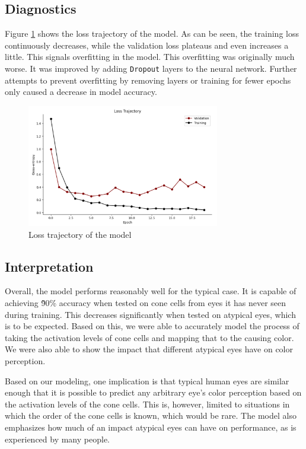 \documentclass[titlepage]{article}
\begin{document}
\subsection{Diagnostics}

Figure \ref{fig:loss_trajectory} shows the loss trajectory of the model. As can be seen, the training loss continuously decreases, while the validation loss plateaus and even increases a little. This signals overfitting in the model. This overfitting was originally much worse. It was improved by adding \lstinline{Dropout} layers to the neural network. Further attempts to prevent overfitting by removing layers or training for fewer epochs only caused a decrease in model accuracy.

\begin{figure}[H]
    \centering
    \includegraphics[width=0.75\textwidth]{figs/loss_trajectory.png}
    \caption{Loss trajectory of the model}
    \label{fig:loss_trajectory}
\end{figure}

\subsection{Interpretation}

Overall, the model performs reasonably well for the typical case. It is capable of achieving \~90\% accuracy when tested on cone cells from eyes it has never seen during training. This decreases significantly when tested on atypical eyes, which is to be expected. Based on this, we were able to accurately model the process of taking the activation levels of cone cells and mapping that to the causing color. We were also able to show the impact that different atypical eyes have on color perception.

\bigskip

Based on our modeling, one implication is that typical human eyes are similar enough that it is possible to predict any arbitrary eye's color perception based on the activation levels of the cone cells. This is, however, limited to situations in which the order of the cone cells is known, which would be rare. The model also emphasizes how much of an impact atypical eyes can have on performance, as is experienced by many people.
\end{document}
